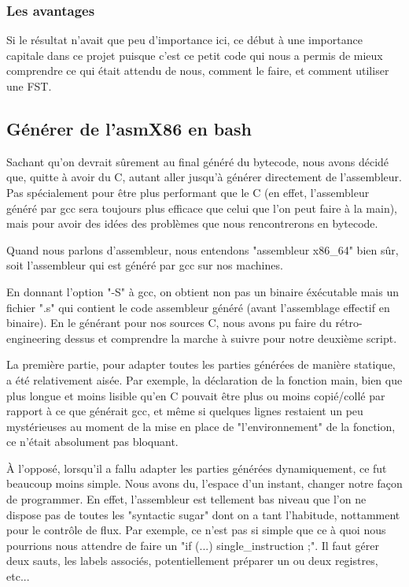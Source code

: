 \subsubsection{Les avantages}

Si le résultat n'avait que peu d'importance ici, ce début à une importance capitale dans ce projet
puisque c'est ce petit code qui nous a permis de mieux comprendre ce qui était attendu de nous,
comment le faire, et comment utiliser une FST.

\subsection{Générer de l'asmX86 en bash}

Sachant qu'on devrait sûrement au final généré du bytecode, nous avons décidé que, quitte à avoir du C,
autant aller jusqu'à générer directement de l'assembleur.
Pas spécialement pour être plus performant que le C (en effet, l'assembleur  généré par gcc
sera toujours plus efficace que celui que l'on peut faire à la main), mais pour avoir des idées
des problèmes que nous rencontrerons en bytecode.

Quand nous parlons d'assembleur, nous entendons "assembleur x86\_64" bien sûr,
soit l'assembleur qui est généré par gcc sur nos machines.


En donnant l'option "-S" à gcc, on obtient non pas un binaire éxécutable
mais un fichier ".s" qui contient le code assembleur généré (avant l'assemblage effectif en binaire).
En le générant pour nos sources C, nous avons pu faire du rétro-engineering dessus
et comprendre la marche à suivre pour notre deuxième script.

La première partie, pour adapter toutes les parties générées de manière statique, a été relativement aisée.
Par exemple, la déclaration de la fonction main, bien que plus longue et moins lisible qu'en C pouvait
être plus ou moins copié/collé par rapport à ce que générait gcc, et même si quelques lignes restaient
un peu mystérieuses au moment de la mise en place de "l'environnement" de la fonction, ce n'était
absolument pas bloquant.

À l'opposé, lorsqu'il a fallu adapter les parties générées dynamiquement, ce fut beaucoup moins simple.
Nous avons du, l'espace d'un instant, changer notre façon de programmer. En effet, l'assembleur
est tellement bas niveau que l'on ne dispose pas de toutes les "syntactic sugar" dont on a
tant l'habitude, nottamment pour le contrôle de flux. Par exemple, ce n'est pas si simple que
ce à quoi nous pourrions nous attendre de faire un "if (...) single\_instruction ;".
Il faut gérer deux sauts, les labels associés, potentiellement préparer un ou deux registres, etc...


